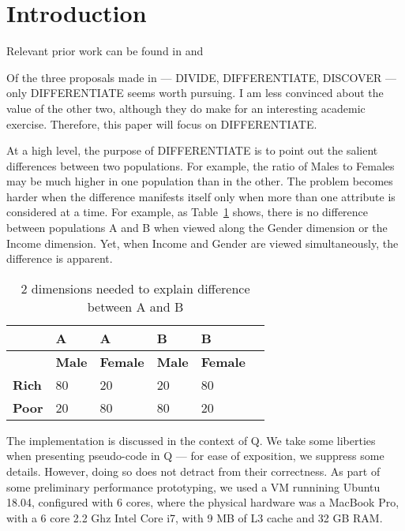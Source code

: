 
\section{Introduction}

Relevant prior work can be found in \cite{sarawagi99}
and \cite{Fagin05}

Of the three proposals made in \cite{Fagin05} --- DIVIDE,
DIFFERENTIATE, DISCOVER --- only DIFFERENTIATE seems worth pursuing. 
I am less convinced about the value of the other two, although they do 
make for an interesting academic exercise. 
Therefore, this paper will focus on DIFFERENTIATE.

At a high level, the purpose of DIFFERENTIATE is to point out the salient
differences between two populations. For example, the ratio of Males to Females
may be much higher in one population than in the other. The problem becomes
harder when the difference manifests itself only when more than one attribute is
considered at a time. For example, as Table~\ref{tbl_sample_multi_dim_diff}
shows, there is no difference between populations A and B when viewed along
the Gender dimension or the Income dimension. Yet, when Income and Gender are
viewed simultaneously, the difference is apparent.

\begin{table}[hbtp]
\centering
\begin{tabular}{|l|l|l||l|l|l|} \hline \hline
           &  {\bf A}   &  {\bf A}     &  {\bf B}   &  {\bf B}    \\ \hline
           & {\bf Male} & {\bf Female} &{\bf Male} & {\bf Female} \\ \hline
{\bf Rich} &    80      &     20       &    20      &     80      \\ \hline
{\bf Poor} &    20      &     80       &    80      &     20      \\ \hline
\hline
\end{tabular}
\caption{2 dimensions needed to explain difference between A and B}
\label{tbl_sample_multi_dim_diff}
\end{table}



The implementation is discussed in the context of Q. We take some liberties when
presenting pseudo-code in Q --- for ease of exposition, we suppress some
details. However, doing so does not detract from their correctness.
As part of some preliminary performance prototyping, we used a VM runnining
Ubuntu 18.04, configured with 6 cores, where the physical hardware was a MacBook
Pro, with a 6 core 2.2 Ghz Intel Core i7, with 9 MB of L3 cache and 32 GB RAM.


